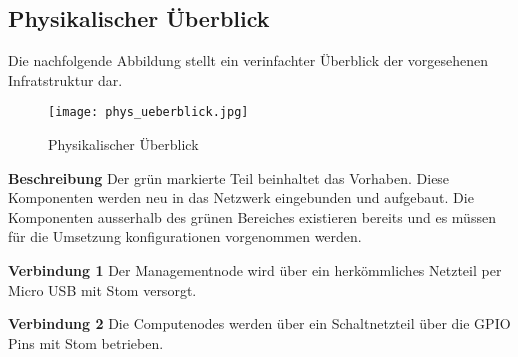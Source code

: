 \subsection{Physikalischer Überblick}
Die nachfolgende Abbildung stellt ein verinfachter Überblick der vorgesehenen Infratstruktur dar.

\begin{figure}[htb]
\centering
\texttt{[image: phys\_ueberblick.jpg]}
\caption{Physikalischer Überblick}
\label{fig:Physikalischer Überblick}
\end{figure} 

\textbf{Beschreibung}\newline
Der grün markierte Teil beinhaltet das Vorhaben. Diese Komponenten werden neu in das Netzwerk eingebunden und aufgebaut. Die Komponenten ausserhalb des grünen Bereiches existieren bereits und es müssen für die Umsetzung konfigurationen vorgenommen werden.

\textbf{Verbindung 1} \newline
Der Managementnode wird über ein herkömmliches Netzteil per Micro USB mit Stom versorgt.

\textbf{Verbindung 2} \newline
Die Computenodes werden über ein Schaltnetzteil über die GPIO Pins mit Stom betrieben.


